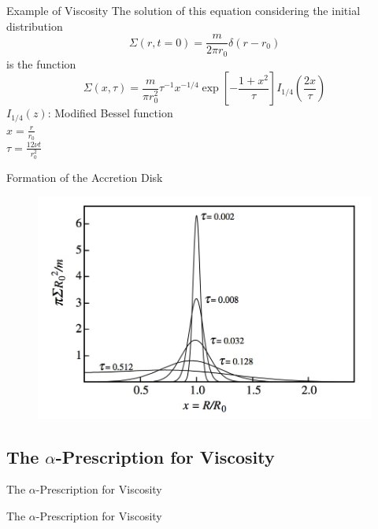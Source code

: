 \documentclass{beamer}
\begin{document}
\begin{frame}{Example of Viscosity}
	The solution of this equation considering the initial distribution
	\[\Sigma(r,t=0) = \frac{m}{2\pi r_0} \delta (r-r_0)\]
	\pause
	is the function
	\[\Sigma(x,\tau) = \frac{m}{\pi r_0^2} \tau^{-1} x^{-1/4} \exp{\left[-\frac{1+x^2}{\tau}\right] } I_{1/4} \left( \frac{2x}{\tau} \right) \]
	\pause
	$I_{1/4} (z)$: Modified Bessel function\\
	$x=\frac{r}{r_0}$\\ 
	$\tau = \frac{12\nu t} {r_0^2}$
\end{frame}

\begin{frame}{Formation of the Accretion Disk}
	\begin{center}
      \begin{figure}
      	\includegraphics[scale=0.3] {figures/diskRadialStructure.jpeg}
      \end{figure}
	\end{center}	
\end{frame}


\subsection{The $\alpha$-Prescription for Viscosity}    

\begin{frame}
\Huge
The $\alpha$-Prescription for Viscosity
\end{frame}

\begin{frame}{The $\alpha$-Prescription for Viscosity}
	
\end{frame}
\end{document}
